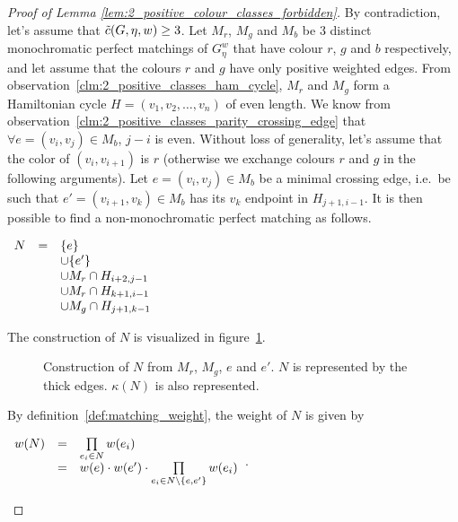\begin{proof}[Proof of Lemma \ref{lem:2_positive_colour_classes_forbidden}]
    By contradiction, let's assume that $\Tilde{c}(G, \eta, w) \geq 3$.
    Let $M_r$, $M_g$ and $M_b$ be 3 distinct monochromatic perfect matchings of $G_\eta^w$ that have colour $r$, $g$ and $b$ respectively, and let assume that the colours $r$ and $g$ have only positive weighted edges.
    From observation~\ref{clm:2_positive_classes_ham_cycle}, $M_r$ and $M_g$ form a Hamiltonian cycle $H = (v_1, v_2, \dots, v_n)$ of even length.
    We know from observation~\ref{clm:2_positive_classes_parity_crossing_edge} that $\forall e = (v_i, v_j) \in M_b$, $j-i$ is even.
    Without loss of generality, let's assume that the color of $(v_i, v_{i + 1})$ is $r$ (otherwise we exchange colours $r$ and $g$ in the following arguments).
    Let $e = (v_i, v_j) \in M_b$ be a minimal crossing edge, i.e.\ be such that $e' = (v_{i+1}, v_k) \in M_b$ has its $v_k$ endpoint in $H_{j+1, i-1}$.
    It is then possible to find a non-monochromatic perfect matching as follows.

    \begin{center}
        $\begin{array}{r c l}
             N & = & \{e\}                    \\
             &   & \cup \{e'\}                \\
             &   & \cup M_r \cap H_{i+2, j-1} \\
             &   & \cup M_r \cap H_{k+1, i-1} \\
             &   & \cup M_g \cap H_{j+1, k-1}
        \end{array}$
    \end{center}

    The construction of $N$ is visualized in figure~\ref{fig:2_pos_classes_proof}.

    \begin{figure}[H]
        \caption{Construction of $N$ from $M_r$, $M_g$, $e$ and $e'$. $N$ is represented by the thick edges.
            $\kappa(N)$ is also represented.}
        \label{fig:2_pos_classes_proof}
    \end{figure}

    By definition~\ref{def:matching_weight}, the weight of $N$ is given by

    \begin{center}
        $\begin{array}{r c l}
            w(N) & = & \prod\limits_{e_i \in N} w(e_i) \\
                 & = & w(e) \cdot w(e') \cdot \prod\limits_{e_i \in N \setminus \{e, e'\}} w(e_i) \\
        \end{array}$.
    \end{center}


\end{proof}
